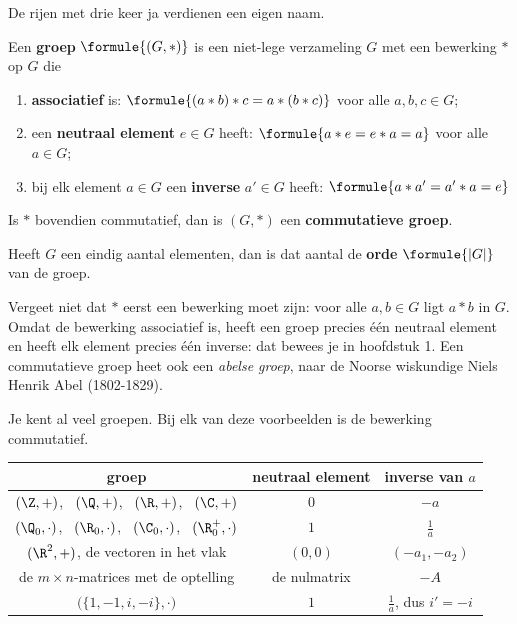 De rijen met drie keer ja verdienen een eigen naam.

\begin{theorie}
Een \textbf{\textcolor{accent}{groep}} $\formule{(G, \ast)}$ is een niet-lege verzameling $G$ met een bewerking $\ast$ op $G$ die

\vspace{1mm}
\begin{enumerate}[leftmargin=8mm,itemsep=1mm]
\item \textbf{\textcolor{accent}{associatief}} is: \quad $\formule{(a \ast b) \ast c = a \ast (b \ast c)}$ \quad voor alle $a, b, c \in G$;
\item een \textbf{\textcolor{accent}{neutraal element}} $e \in G$ heeft: \quad $\formule{a \ast e = e \ast a = a}$ \quad voor alle $a \in G$;
\item bij elk element $a \in G$ een \textbf{\textcolor{accent}{inverse}} $a' \in G$ heeft: \quad $\formule{a \ast a' = a' \ast a = e}$
\end{enumerate}

\vspace{1mm}
Is $\ast$ bovendien commutatief, dan is $(G, \ast)$ een \textbf{\textcolor{accent}{commutatieve groep}}.

\vspace{1mm}
Heeft $G$ een eindig aantal elementen, dan is dat aantal de \textbf{\textcolor{accent}{orde}} $\formule{|G|}$ van de groep.
\end{theorie}

Vergeet niet dat $\ast$ eerst een bewerking moet zijn: voor alle $a, b \in G$ ligt $a \ast b$ in $G$. Omdat de bewerking associatief is, heeft een groep precies één neutraal element en heeft elk element precies één inverse: dat bewees je in hoofdstuk 1. Een commutatieve groep heet ook een \textit{abelse groep}, naar de Noorse wiskundige Niels Henrik Abel (1802-1829).

Je kent al veel groepen. Bij elk van deze voorbeelden is de bewerking commutatief.

\begin{center}
\renewcommand{\arraystretch}{1.3}
\begin{tabular}{|c|c|c|}
\hline
\rowcolor{accent!14} groep & neutraal element & inverse van $a$ \\ \hline
$(\Z, +)$, \ $(\Q, +)$, \ $(\R, +)$, \ $(\C, +)$ & $0$ & $-a$ \\ \hline
$(\Q_0, \cdot)$, \ $(\R_0, \cdot)$, \ $(\C_0, \cdot)$, \ $(\R^+_0, \cdot)$ & $1$ & $\tfrac1a$ \\ \hline
$(\R^2, +)$, de vectoren in het vlak & $(0, 0)$ & $(-a_1, -a_2)$ \\ \hline
de $m \times n$-matrices met de optelling & de nulmatrix & $-A$ \\ \hline
$\bigl(\{1, -1, i, -i\}, \cdot\bigr)$ & $1$ & $\tfrac1a$, dus $i' = -i$ \\ \hline
\end{tabular}
\end{center}

